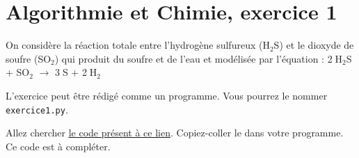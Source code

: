\documentclass[11pt]{article}
\begin{document}
\newpage

\section{Algorithmie et Chimie, exercice 1}





\bigskip


On considère la réaction totale entre l’hydrogène sulfureux (H$_2$S) et le dioxyde de soufre (SO$_2$) qui  produit du soufre et de l’eau et modélisée par l'équation : 
2$\;$H$_2$S  + SO$_2$ $\longrightarrow$ 3$\;$S + 2$\;$H$_2$


\medskip
L'exercice peut être rédigé comme un programme. Vous pourrez le nommer \texttt{exercice1.py}. 

\medskip

Allez chercher \href{https://github.com/formationPythonPC-Juin/aides-formation/blob/master/exercice1-aide.py}{\underline{le code présent à ce lien}}. Copiez-coller le dans votre programme. Ce code est à compléter.
\end{document}
